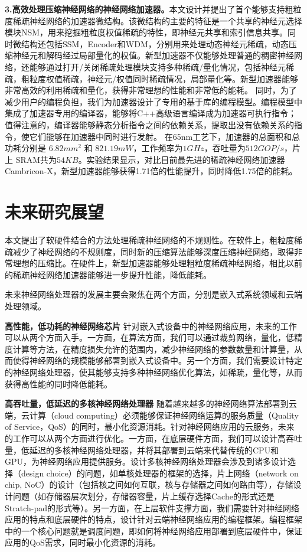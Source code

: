 \textbf{3.高效处理压缩神经网络的神经网络加速器。}本文设计并提出了首个能够支持粗粒度稀疏神经网络的加速器微结构。该微结构的主要的特征是一个共享的神经元选择模块NSM，用来挖掘粗粒度权值稀疏的特性，即神经元共享和索引信息共享。同时微结构还包括SSM，Encoder和WDM，分别用来处理动态神经元稀疏，动态压缩神经元和解码经过局部量化的权值。新型加速器不仅能够处理普通的稠密神经网络，还能够通过打开/关闭稀疏处理模块支持多种稀疏/量化情况，包括神经元稀疏，粗粒度权值稀疏，神经元/权值同时稀疏情况，局部量化等。新型加速器能够非常高效的利用稀疏和量化，获得非常理想的性能和非常低的能耗。
同时，为了减少用户的编程负担，我们为加速器设计了专用的基于库的编程模型。编程模型中集成了加速器专用的编译器，能够将C++高级语言编译成为加速器可执行指令；值得注意的，编译器能够静态分析指令之间的依赖关系，提取出没有依赖关系的指令，使它们能够在加速器中同时进行发射。
在65nm工艺下，加速器的总面积和总功耗分别是 $6.82mm^2$ 和 $821.19mW$，工作频率为$1GHz$，吞吐量为$512GOP/s$，片上 SRAM共为$54KB$。实验结果显示，对比目前最先进的稀疏神经网络加速器Cambricon-X，新型加速器能够获得1.71倍的性能提升，同时降低1.75倍的能耗。

\section{未来研究展望}

本文提出了软硬件结合的方法处理稀疏神经网络的不规则性。在软件上，粗粒度稀疏减少了神经网络的不规则度，同时新的压缩算法能够深度压缩神经网络，取得非常理想的压缩比。在硬件上，新型加速器能够处理粗粒度稀疏神经网络，相比以前的稀疏神经网络加速器能够进一步提升性能，降低能耗。

未来神经网络处理器的发展主要会聚焦在两个方面，分别是嵌入式系统领域和云端处理领域。

\textbf{高性能，低功耗的神经网络芯片}
针对嵌入式设备中的神经网络应用，未来的工作可以从两个方面入手。一方面，在算法方面，我们可以通过裁剪网络，量化，低精度计算等方法，在精度损失允许的范围内，减少神经网络的参数数量和计算量，从而使得神经网络的规模能够部署到嵌入式设备中。另一个方面，我们需要设计特定的神经网络处理器，使其能够支持多种神经网络优化算法，如稀疏，量化等，从而获得高性能的同时降低能耗。

\textbf{高吞吐量，低延迟的多核神经网络处理器}
随着越来越多的神经网络算法部署到云端，云计算（cloud computing）必须能够保证神经网络运算的服务质量（Quality of Service，QoS）的同时，最小化资源消耗。针对神经网络应用的云服务，未来的工作可以从两个方面进行优化。一方面，在底层硬件方面，我们可以设计高吞吐量，低延迟的多核神经网络处理器，并将其部署到云端来代替传统的CPU和GPU，为神经网络应用提供服务。设计多核神经网络处理器会涉及到诸多设计选择（design choice）的问题，如单核处理器的框架的选择，片上网络（network on chip, NoC）的设计（包括核之间如何互联，核与存储器之间如何路由等），存储设计问题（如存储器层次划分，存储器容量，片上缓存选择Cache的形式还是Stratch-pad的形式等）。另一方面，在上层软件支撑方面，我们需要针对神经网络应用的特点和底层硬件的特点，设计针对云端神经网络应用的编程框架。编程框架中的一个核心问题就是调度问题，即如何将神经网络应用部署到底层硬件中，保证应用的QoS需求，同时最小化资源的消耗。


